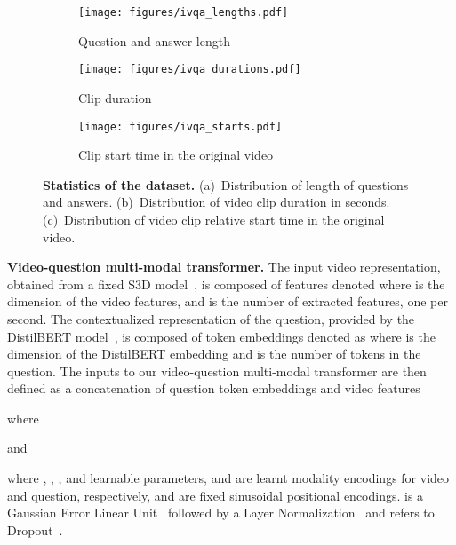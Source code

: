 \begin{figure}[t]
\centering
\begin{subfigure}{.5\textwidth}
\texttt{[image: figures/ivqa\_lengths.pdf]}
\caption{Question and answer length}
\end{subfigure}
\begin{subfigure}{.5\textwidth}
\texttt{[image: figures/ivqa\_durations.pdf]}
\caption{Clip duration}
\end{subfigure}
\begin{subfigure}{.5\textwidth}
\texttt{[image: figures/ivqa\_starts.pdf]}
\caption{Clip start time in the original video}
\end{subfigure}
\vspace{-.3cm}
\caption{{\bf Statistics of the \smalldatasetname{} dataset.} (a)~Distribution of length of questions and answers. (b)~Distribution of video clip duration in seconds. (c)~Distribution of video clip relative start time in the original video.}
\label{fig:length}
\vspace{-.6cm}
\end{figure}

\noindent \textbf{Video-question multi-modal transformer.} The input video representation, obtained from a fixed S3D model~\cite{xie2018rethinking}, is composed of  features denoted   where  is the dimension of the video features, and  is the number of extracted features, one per second. 
The contextualized representation of the question, provided by the DistilBERT model~\cite{sanh2019distilbert}, is composed of  token embeddings denoted as  where  is the dimension of the DistilBERT embedding and  is the number of tokens in the question. 
The inputs to our video-question multi-modal transformer are then defined as a concatenation of question token embeddings and video features
 
where 
 
and 

where , , ,  and learnable parameters,  and  are learnt modality encodings for video and question, respectively, and  are fixed sinusoidal positional encodings.  is a Gaussian Error Linear Unit~\cite{hendrycks2016gaussian} followed by a Layer Normalization~\cite{ba2016layer} and  refers to Dropout~\cite{srivastava2014dropout}.

